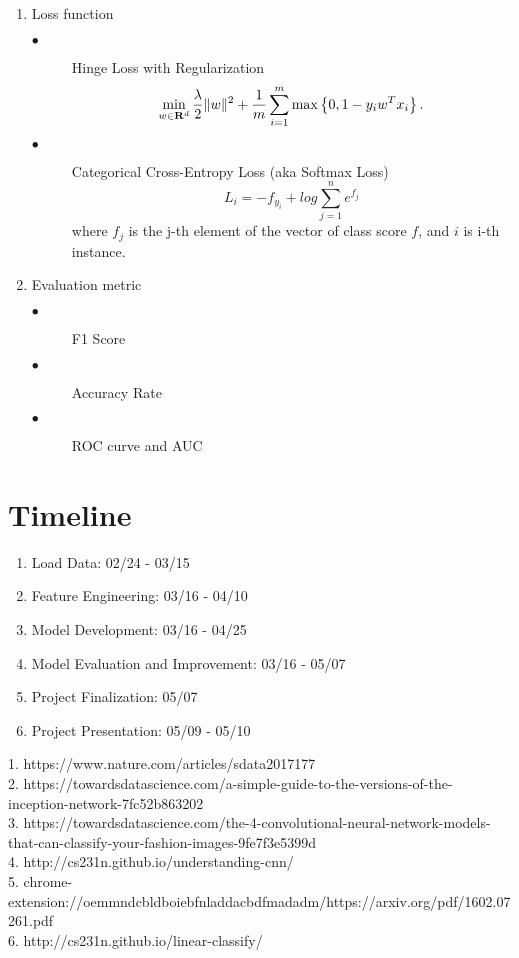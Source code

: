 \documentclass[ruled]{article}
\begin{document}
\begin{enumerate}

\item Loss function

\begin{description}
  \item[$\bullet$] Hinge Loss with Regularization
\[
\min_{w\in\mathbf{R}^{d}}\frac{\lambda}{2}\|w\|^{2}+\frac{1}{m}\sum_{i=1}^{m}\max\left\{ 0,1-y_{i}w^{T}x_{i}\right\} .
\]
  \item[$\bullet$] Categorical Cross-Entropy Loss (aka Softmax Loss)
\[
L_i = -f_{y_i} + log \sum_{j=1}^{n} e^{f_j}
\]
where $f_j$ is the j-th element of the vector of class score $f$, and $i$ is i-th instance. 
\end{description}


\item Evaluation metric 

\begin{description}
  \item[$\bullet$] F1 Score
  \item[$\bullet$] Accuracy Rate
  \item[$\bullet$] ROC curve and AUC
\end{description}

\end{enumerate}

\section{Timeline}

\begin{enumerate}
\item Load Data: 02/24 - 03/15 
\item Feature Engineering: 03/16 - 04/10
\item Model Development: 03/16 - 04/25
\item Model Evaluation and Improvement: 03/16 - 05/07 
\item Project Finalization: 05/07
\item Project Presentation: 05/09 - 05/10

\end{enumerate}


\newpage

1. https://www.nature.com/articles/sdata2017177\\
2. https://towardsdatascience.com/a-simple-guide-to-the-versions-of-the-inception-network-7fc52b863202\\
3. https://towardsdatascience.com/the-4-convolutional-neural-network-models-that-can-classify-your-fashion-images-9fe7f3e5399d\\
4. http://cs231n.github.io/understanding-cnn/\\
5. chrome-extension://oemmndcbldboiebfnladdacbdfmadadm/https://arxiv.org/pdf/1602.07261.pdf \\
6. http://cs231n.github.io/linear-classify/ \\
\end{document}
